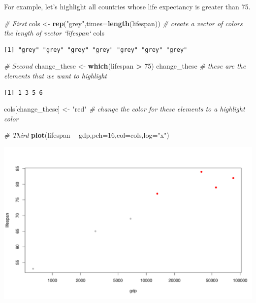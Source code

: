 \documentclass[
]{book}
\newenvironment{Shaded}{\begin{snugshade}}{\end{snugshade}}
\newcommand{\CommentTok}[1]{\textcolor[rgb]{0.56,0.35,0.01}{\textit{#1}}}
\newcommand{\DataTypeTok}[1]{\textcolor[rgb]{0.13,0.29,0.53}{#1}}
\newcommand{\DecValTok}[1]{\textcolor[rgb]{0.00,0.00,0.81}{#1}}
\newcommand{\KeywordTok}[1]{\textcolor[rgb]{0.13,0.29,0.53}{\textbf{#1}}}
\newcommand{\NormalTok}[1]{#1}
\newcommand{\OperatorTok}[1]{\textcolor[rgb]{0.81,0.36,0.00}{\textbf{#1}}}
\newcommand{\StringTok}[1]{\textcolor[rgb]{0.31,0.60,0.02}{#1}}
\begin{document}
For example, let's highlight all countries whose life expectancy is greater than 75.

\begin{Shaded}
\begin{Highlighting}[]
\CommentTok{# First}
\NormalTok{cols <-}\StringTok{ }\KeywordTok{rep}\NormalTok{(}\StringTok{"grey"}\NormalTok{,}\DataTypeTok{times=}\KeywordTok{length}\NormalTok{(lifespan)) }\CommentTok{# create a vector of colors the length of vector `lifespan`}
\NormalTok{cols}
\end{Highlighting}
\end{Shaded}

\begin{verbatim}
[1] "grey" "grey" "grey" "grey" "grey" "grey" "grey"
\end{verbatim}

\begin{Shaded}
\begin{Highlighting}[]
\CommentTok{# Second}
\NormalTok{change_these <-}\StringTok{ }\KeywordTok{which}\NormalTok{(lifespan }\OperatorTok{>}\StringTok{ }\DecValTok{75}\NormalTok{) }
\NormalTok{change_these }\CommentTok{# these are the elements that we want to highlight}
\end{Highlighting}
\end{Shaded}

\begin{verbatim}
[1] 1 3 5 6
\end{verbatim}

\begin{Shaded}
\begin{Highlighting}[]
\NormalTok{cols[change_these] <-}\StringTok{ "red"}  \CommentTok{# change the color for these elements to a highlight color}

\CommentTok{# Third}
\KeywordTok{plot}\NormalTok{(lifespan }\OperatorTok{~}\StringTok{ }\NormalTok{gdp,}\DataTypeTok{pch=}\DecValTok{16}\NormalTok{,}\DataTypeTok{col=}\NormalTok{cols,}\DataTypeTok{log=}\StringTok{"x"}\NormalTok{)}
\end{Highlighting}
\end{Shaded}

\includegraphics{figures/unnamed-chunk-124-1.pdf}
\end{document}
